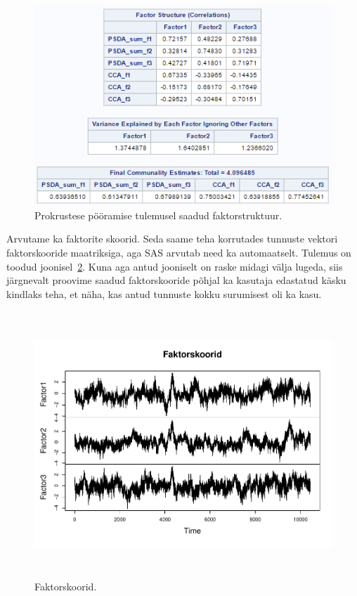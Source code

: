 \documentclass[a4paper,12pt]{report}
\begin{document}
\begin{figure}[h!]
	\centering\includegraphics{prokrustes.png}
	\caption{Prokrustese pööramise tulemusel saadud faktorstruktuur.}\label{prokrustes}
\end{figure}

Arvutame ka faktorite skoorid. Seda saame teha korrutades tunnuste vektori faktorskooride maatriksiga, aga SAS arvutab need ka automaatselt. Tulemus on toodud joonisel~\ref{skoorid}. Kuna aga antud jooniselt on raske midagi välja lugeda, siis järgnevalt proovime saadud faktorskooride põhjal ka kasutaja edastatud käsku kindlaks teha, et näha, kas antud tunnuste kokku surumisest oli ka kasu.

\begin{figure}[h!]
	\centering\includegraphics[height=10cm]{skoorid.pdf}
	\caption{Faktorskoorid.}\label{skoorid}
\end{figure}
\end{document}
